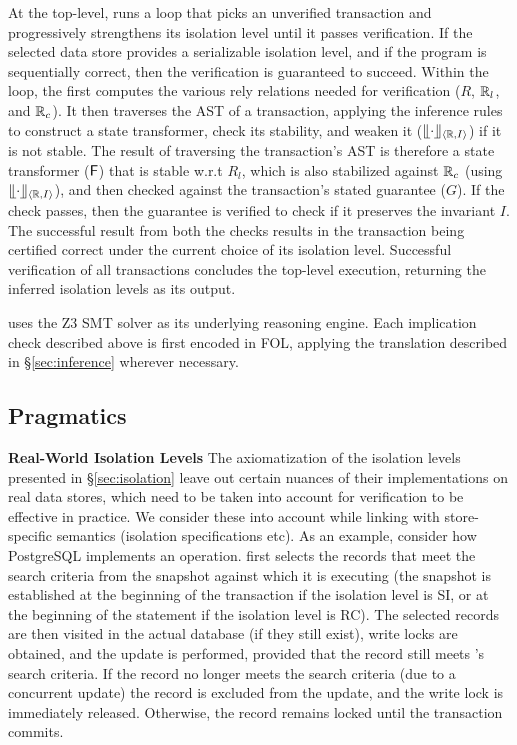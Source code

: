 At the top-level, \tool runs a loop that picks an unverified
transaction and progressively strengthens its isolation level until it
passes verification. If the selected data store provides a
serializable isolation level, and if the program is sequentially
correct, then the verification is guaranteed to succeed. Within the
loop, the \tool first computes the various rely relations needed for
verification ($R$, $\mathbb{R}_l$, and $\mathbb{R}_c$). It then traverses the AST of a
transaction, applying the inference rules to construct a state
transformer, check its stability, and weaken it ($\llfloor \cdot \rrfloor_{\langle \mathbb{R},I \rangle}$)
if it is not stable. The result of traversing the transaction's AST is
therefore a state transformer (${\sf F}$) that is stable w.r.t $R_l$, which
is also stabilized against $\mathbb{R}_c$ (using $\llfloor \cdot \rrfloor_{\langle \mathbb{R},I \rangle}$), and
then checked against the transaction's stated guarantee ($G$). If the
check passes, then the guarantee is verified to check if it preserves
the invariant $I$. The successful result from both the checks results
in the transaction being certified correct under the current choice of
its isolation level. Successful verification of all transactions
concludes the top-level execution, returning the inferred isolation
levels as its output.

\tool uses the Z3 SMT solver as its underlying reasoning engine. Each
implication check described above is first encoded in FOL, applying
the translation described in \S\ref{sec:inference} wherever
necessary.

\subsection{Pragmatics}

\textbf{Real-World Isolation Levels} The axiomatization of the
isolation levels presented in \S\ref{sec:isolation} leave out
certain nuances of their implementations on real data stores, which
need to be taken into account for verification to be effective in
practice.  We consider these into account while linking \tool with
store-specific semantics (isolation specifications etc). As an
example, consider how PostgreSQL implements an  operation.
 first selects the records that meet the search criteria
from the snapshot against which it is executing (the snapshot is
established at the beginning of the transaction if the isolation level
is SI, or at the beginning of the  statement if the
isolation level is RC). The selected records are then visited in the
actual database (if they still exist), write locks are obtained, and
the update is performed, provided that the record still meets
's search criteria. If the record no longer meets the
search criteria (due to a concurrent update) the record is excluded
from the update, and the write lock is immediately released.
Otherwise, the record remains locked until the transaction commits. 

